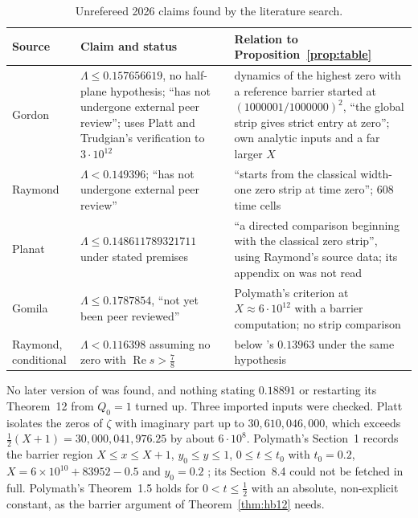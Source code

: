 \documentclass[11pt]{article}
\theoremstyle{definition}
\theoremstyle{remark}
\newcommand{\re}{\operatorname{Re}}
\numberwithin{equation}{section}
\begin{document}
\begin{table}[ht]
\centering\small
\begin{tabularx}{\textwidth}{@{}>{\raggedright\arraybackslash}p{}>{\raggedright\arraybackslash}p{}X@{}}
\toprule
Source & Claim and status & Relation to Proposition~\ref{prop:table}\\
\midrule
Gordon \cite{gordon} & $\Lambda\le0.157656619$, no half-plane hypothesis; ``has not undergone external peer review''; uses Platt and Trudgian's verification to $3\cdot10^{12}$ & dynamics of the highest zero with a reference barrier started at $(1000001/1000000)^2$, ``the global strip gives strict entry at zero''; own analytic inputs and a far larger $X$\\
Raymond \cite{raymond} & $\Lambda<0.149396$; ``has not undergone external peer review'' & ``starts from the classical width-one zero strip at time zero''; 608 time cells\\
Planat \cite{planat} & $\Lambda\le0.148611789321711$ under stated premises & ``a directed comparison beginning with the classical zero strip'', using Raymond's source data; its appendix on \cite{hb} was not read\\
Gomila \cite{gomila} & $\Lambda\le0.1787854$, ``not yet been peer reviewed'' & Polymath's criterion at $X\approx6\cdot10^{12}$ with a barrier computation; no strip comparison\\
Raymond, conditional \cite{raymondcond} & $\Lambda<0.116398$ assuming no zero with $\re s>\frac78$ & below \cite{hb}'s $0.13963$ under the same hypothesis\\
\bottomrule
\end{tabularx}
\caption{Unrefereed 2026 claims found by the literature search.}\label{tab:literature}
\end{table}

No later version of \cite{hb} was found, and nothing stating $0.18891$ or
restarting its Theorem~12 from $Q_0=1$ turned up. Three imported inputs
were checked. Platt \cite{platt2017} isolates the zeros of $\zeta$ with
imaginary part up to $30{,}610{,}046{,}000$, which exceeds
$\frac12(X+1)=30{,}000{,}041{,}976.25$ by about $6\cdot10^8$. Polymath's
Section~1 records the barrier region $X\le x\le X+1$, $y_0\le y\le1$,
$0\le t\le t_0$ with $t_0=0.2$, $X=6\times10^{10}+83952-0.5$ and $y_0=0.2$
\cite{polymath}; its Section~8.4 could not be fetched in full. Polymath's
Theorem~1.5 holds for $0<t\le\frac12$ with an absolute, non-explicit
constant, as the barrier argument of Theorem~\ref{thm:hb12} needs.
\end{document}
